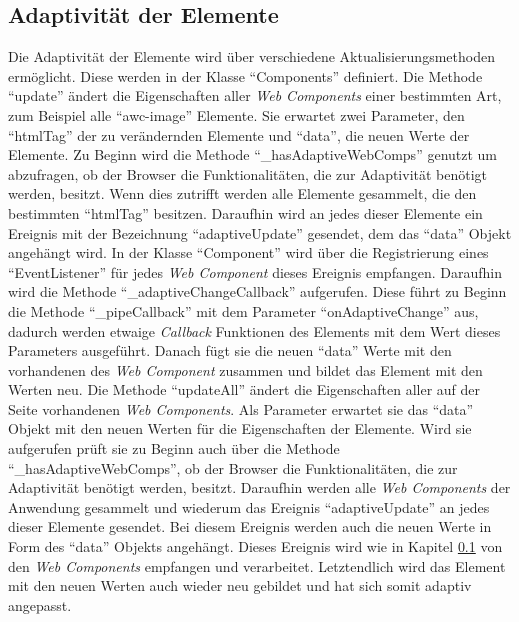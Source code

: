 \documentclass[12pt, paper=a4, bibtotoc, toc=listof, headsepline=true]{scrreprt}
\begin{document}
	\subsection{Adaptivität der Elemente}
	\label{sec:adaDerEle}
	Die Adaptivität der Elemente wird über verschiedene Aktualisierungsmethoden ermöglicht. Diese werden in der Klasse \enquote{Components} definiert. Die Methode \enquote{update} ändert die Eigenschaften aller \emph{Web Components} einer bestimmten Art, zum Beispiel alle \enquote{awc-image} Elemente. Sie erwartet zwei Parameter, den \enquote{htmlTag} der zu verändernden Elemente und \enquote{data}, die neuen Werte der Elemente. Zu Beginn wird die Methode \enquote{\_hasAdaptiveWebComps} genutzt um abzufragen, ob der Browser die Funktionalitäten, die zur Adaptivität benötigt werden, besitzt. Wenn dies zutrifft werden alle Elemente gesammelt, die den bestimmten \enquote{htmlTag} besitzen. Daraufhin wird an jedes dieser Elemente ein Ereignis mit der Bezeichnung \enquote{adaptiveUpdate} gesendet, dem das \enquote{data} Objekt angehängt wird.
	In der Klasse \enquote{Component} wird über die Registrierung eines \enquote{EventListener} für jedes \emph{Web Component} dieses Ereignis empfangen. Daraufhin wird die Methode \enquote{\_adaptiveChangeCallback} aufgerufen. Diese führt zu Beginn die Methode \enquote{\_pipeCallback} mit dem Parameter \enquote{onAdaptiveChange} aus, dadurch werden etwaige \emph{Callback} Funktionen des Elements mit dem Wert dieses Parameters ausgeführt. Danach fügt sie die neuen \enquote{data} Werte mit den vorhandenen des \emph{Web Component} zusammen und bildet das Element mit den Werten neu.
	\newline
	Die Methode \enquote{updateAll} ändert die Eigenschaften aller auf der Seite vorhandenen \emph{Web Components}. Als Parameter erwartet sie das \enquote{data} Objekt mit den neuen Werten für die Eigenschaften der Elemente. Wird sie aufgerufen prüft sie zu Beginn auch über die Methode \enquote{\_hasAdaptiveWebComps}, ob der Browser die Funktionalitäten, die zur Adaptivität benötigt werden, besitzt. Daraufhin werden alle \emph{Web Components} der Anwendung gesammelt und wiederum das Ereignis \enquote{adaptiveUpdate} an jedes dieser Elemente gesendet. Bei diesem Ereignis werden auch die neuen Werte in Form des \enquote{data} Objekts angehängt. Dieses Ereignis wird wie in Kapitel \ref{sec:adaDerEle} von den \emph{Web Components} empfangen und verarbeitet. Letztendlich wird das Element mit den neuen Werten auch wieder neu gebildet und hat sich somit adaptiv angepasst.
	\newline
\end{document}

